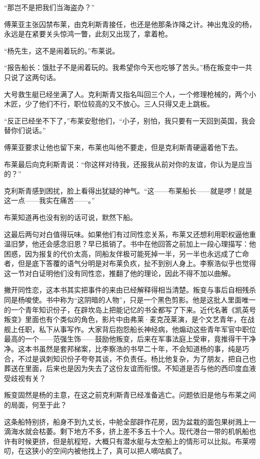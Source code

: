 \par “那岂不是把我们当海盗办？”
\par 傅莱亚主张囚禁布莱，由克利斯青接任，也还是他那条诈降之计。神出鬼没的杨，永远是在紧要关头惊鸿一瞥，此刻又出现了，拿着枪。
\par “杨先生，这不是闹着玩的。”布莱说。
\par “报告船长：饿肚子不是闹着玩的。我希望你今天也吃够了苦头。”杨在叛变中一共只说了这两句话。
\par 大号救生艇已经坐满了人。克利斯青又指名叫回三个人，一个修理枪械的，两个小木匠，少了他们不行，职位较高的又不放心。三人只得又走上跳板。
\par “反正已经坐不下了，”布莱安慰他们，“小子，别怕，我只要有一天回到英国，我会替你们说话。”
\par 傅莱亚要求让他也留下来，布莱也叫他不要走，但是克利斯青硬逼着他下去。
\par 布莱最后向克利斯青说：“你这样对待我，还报我从前对你的友谊，你认为是应当的？”
\par 克利斯青感到困扰，脸上看得出犹疑的神气。“这——布莱船长——就是啰！就是这一点——我实在痛苦——。”
\par 布莱知道再也没有别的话可说，默然下船。
\par 这最后两句对白值得玩味。如果他们有过同性恋关系，布莱又还想利用职权逼他重温旧梦，他还会感念旧恩？早已抵销了。书中在他回答之前加上一段心理描写：他困惑，因为报复的代价太高，同船友伴极可能死掉一半，另一半也永远成了亡命者，但是底下答覆的语气分明是对布莱负疚，扯不到别人身上。李察浩似乎也觉得这一节对白证明他们没有同性恋，推翻了他的理论，因此不得不加以曲解。
\par 撇开同性恋，这本书其实把事件的来由已经解释得相当清楚。叛变与事后自相残杀同是杨唆使。书中称为“这阴暗的人物”，只是一个黑色剪影。他是这批人里面唯一的一个青年知识份子，在辟坎岛上把能记忆的书全都写了下来。近代名著《凯英号叛变》里面也有个类似的角色，影片中由弗莱·麦克茂莱演，是个文艺青年，在战舰上任职，私下从事写作。大家背后抱怨船长神经病，他煽动这些青年军官中职位最高的一个——范强生饰——鼓励他叛变，后来在军事法庭上受审，竟推得干干净净。这本书虽然是套邦梯案，比李察浩的书早二十年，不会知道杨的事，纯是巧合，不过是讽刺知识份子夸夸其谈，不负责任。杨比他复杂，为了朋友，把自己也葬送在里面，后来也是因为失去了这份友谊而衔恨。不知道是否与他的西印度血液受歧视有关？
\par 叛变固然是杨的主意，在这之前克利斯青已经准备逃亡。问题依旧是他与布莱之间的局面，何至于此？
\par 这条船特别挤，船身不到九丈长，中舱全部辟作花房，因为盆栽的面包果树溅上一滴海水就会枯萎。剩下地方不多，挤上差不多五十个人。现代港台一带的机帆船也许有时候更挤，但是航程短，大概只有潜水艇与太空船上的情形可以比拟。布莱唠叨，在这狭小的空间内被他找上了，真可以把人嘀咕疯了。
